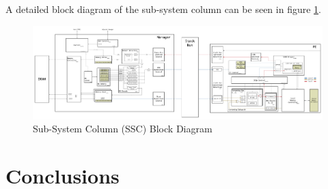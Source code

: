 \documentclass[journal]{IEEEtran}
\begin{document}
A detailed block diagram of the sub-system column can be seen in figure \ref{fig:DetailedBlockDiagram}.
\begin{figure}[!t]
\centering
\captionsetup{justification=centering}
\centerline{
\mbox{\includegraphics[width=6.0in]{DetailedBlockDiagram.jpg}}
}
\center\caption{Sub-System Column (SSC) Block Diagram}
\label{fig:DetailedBlockDiagram}
\end{figure}

\section{Conclusions}
\label{sec:Conclusions}




\ifCLASSOPTIONcaptionsoff
  \newpage
\fi





%
%
%


%
\end{document}
